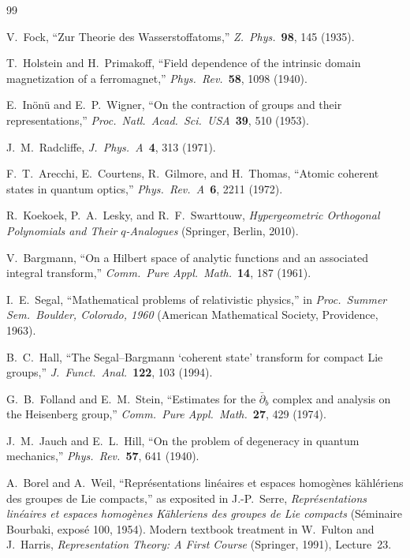 \documentclass[twocolumn,pra,amsmath,amssymb,superscriptaddress]{revtex4-2}
\begin{document}
\begin{thebibliography}{99}

V.~Fock,
``Zur Theorie des Wasserstoffatoms,''
\textit{Z.\ Phys.}\ \textbf{98}, 145 (1935).

T.~Holstein and H.~Primakoff,
``Field dependence of the intrinsic domain magnetization of a
ferromagnet,''
\textit{Phys.\ Rev.}\ \textbf{58}, 1098 (1940).

E.~In\"on\"u and E.~P.~Wigner,
``On the contraction of groups and their representations,''
\textit{Proc.\ Natl.\ Acad.\ Sci.\ USA}\ \textbf{39}, 510 (1953).

J.~M.~Radcliffe,
\textit{J.\ Phys.\ A}\ \textbf{4}, 313 (1971).

F.~T.~Arecchi, E.~Courtens, R.~Gilmore, and H.~Thomas,
``Atomic coherent states in quantum optics,''
\textit{Phys.\ Rev.\ A}\ \textbf{6}, 2211 (1972).

R.~Koekoek, P.~A.~Lesky, and R.~F.~Swarttouw,
\textit{Hypergeometric Orthogonal Polynomials and Their
$q$-Analogues} (Springer, Berlin, 2010).

V.~Bargmann,
``On a Hilbert space of analytic functions and an associated
integral transform,''
\textit{Comm.\ Pure Appl.\ Math.}\ \textbf{14}, 187 (1961).

I.~E.\ Segal,
``Mathematical problems of relativistic physics,''
in \textit{Proc.\ Summer Sem.\ Boulder, Colorado, 1960}
(American Mathematical Society, Providence, 1963).

B.~C.\ Hall,
``The Segal--Bargmann `coherent state' transform for compact Lie
groups,''
\textit{J.\ Funct.\ Anal.}\ \textbf{122}, 103 (1994).

G.~B.\ Folland and E.~M.\ Stein,
``Estimates for the $\bar{\partial}_b$ complex and analysis on the
Heisenberg group,''
\textit{Comm.\ Pure Appl.\ Math.}\ \textbf{27}, 429 (1974).

J.~M.\ Jauch and E.~L.\ Hill,
``On the problem of degeneracy in quantum mechanics,''
\textit{Phys.\ Rev.}\ \textbf{57}, 641 (1940).

A.~Borel and A.~Weil, ``Repr\'esentations lin\'eaires et espaces
homog\`enes k\"ahl\'eriens des groupes de Lie compacts,'' as
exposited in J.-P.\ Serre, \textit{Repr\'esentations lin\'eaires et
espaces homog\`enes K\"ahleriens des groupes de Lie compacts}
(S\'eminaire Bourbaki, expos\'e 100, 1954).  Modern textbook
treatment in W.~Fulton and J.~Harris,
\textit{Representation Theory: A First Course} (Springer, 1991),
Lecture~23.


\end{thebibliography}
\end{document}
